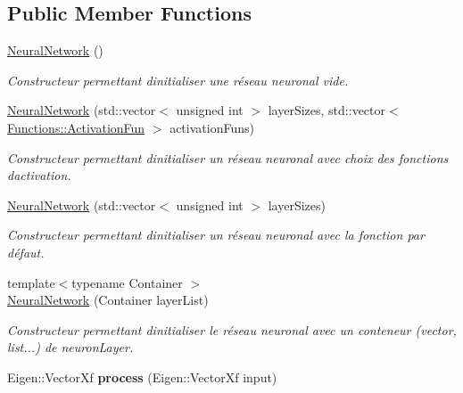 \subsection*{Public Member Functions}
\begin{DoxyCompactItemize}
\item 
\hyperlink{classNeuralNetwork_accce4a7728e89a009a9d4ca1758c9b9d}{Neural\+Network} ()
\begin{DoxyCompactList}\small\item\em Constructeur permettant d\textquotesingle{}initialiser une réseau neuronal vide. \end{DoxyCompactList}\item 
\hyperlink{classNeuralNetwork_a85cd20f411e96dfd28954fcda39badb7}{Neural\+Network} (std\+::vector$<$ unsigned int $>$ layer\+Sizes, std\+::vector$<$ \hyperlink{structFunctions_ad25362ffa52b2f7933431190546593ac}{Functions\+::\+Activation\+Fun} $>$ activation\+Funs)
\begin{DoxyCompactList}\small\item\em Constructeur permettant d\textquotesingle{}initialiser un réseau neuronal avec choix des fonctions d\textquotesingle{}activation. \end{DoxyCompactList}\item 
\hyperlink{classNeuralNetwork_ab4015471a72a3d00b6bcabf156526f7b}{Neural\+Network} (std\+::vector$<$ unsigned int $>$ layer\+Sizes)
\begin{DoxyCompactList}\small\item\em Constructeur permettant d\textquotesingle{}initialiser un réseau neuronal avec la fonction par défaut. \end{DoxyCompactList}\item 
{\footnotesize template$<$typename Container $>$ }\\\hyperlink{classNeuralNetwork_a7943bb4e9cb96aae048b236d4f1dd979}{Neural\+Network} (Container layer\+List)
\begin{DoxyCompactList}\small\item\em Constructeur permettant d\textquotesingle{}initialiser le réseau neuronal avec un conteneur (vector, list...) de neuron\+Layer. \end{DoxyCompactList}\item 
\mbox{\label{classNeuralNetwork_a98cab3b3726fbf06dca316068c29c783}} 
Eigen\+::\+Vector\+Xf {\bfseries process} (Eigen\+::\+Vector\+Xf input)
\end{DoxyCompactItemize}
